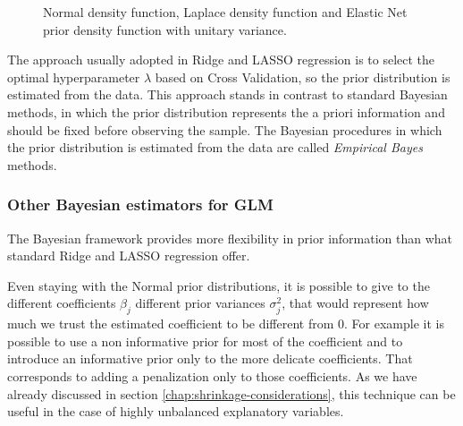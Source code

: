 \documentclass[a4paper, nobind]{templates/ociamthesis}
\theoremstyle{definition}
\theoremstyle{definition}
\theoremstyle{definition}
\theoremstyle{remark}
\begin{document}
\begin{figure}[!hbtp]

{\centering {}\newline{}

}

\caption[Normal density function, Laplace density function and Elastic Net prior density function with unitary variance.]{Normal density function, Laplace density function and Elastic Net prior density function with unitary variance.}\label{fig:normal-laplace}
\end{figure}

The approach usually adopted in Ridge and LASSO regression is to select the optimal hyperparameter \(\lambda\) based on Cross Validation, so the prior distribution is estimated from the data. This approach stands in contrast to standard Bayesian methods, in which the prior distribution represents the a priori information and should be fixed before observing the sample. The Bayesian procedures in which the prior distribution is estimated from the data are called \emph{Empirical Bayes} methods.

\hypertarget{other-bayesian-estimators-for-glm}{%
\subsubsection{Other Bayesian estimators for GLM}\label{other-bayesian-estimators-for-glm}}

The Bayesian framework provides more flexibility in prior information than what standard Ridge and LASSO regression offer.

Even staying with the Normal prior distributions, it is possible to give to the different coefficients \(\beta_j\) different prior variances \(\sigma_j^2\), that would represent how much we trust the estimated coefficient to be different from \(0\). For example it is possible to use a non informative prior for most of the coefficient and to introduce an informative prior only to the more delicate coefficients. That corresponds to adding a penalization only to those coefficients. As we have already discussed in section \ref{chap:shrinkage-considerations}, this technique can be useful in the case of highly unbalanced explanatory variables.
\end{document}
